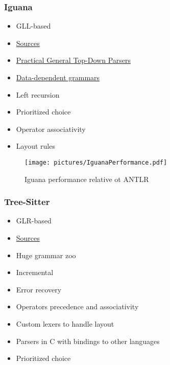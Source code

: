 \documentclass[xcolor=table,aspectratio=169]{beamer}
\begin{document}
\begin{frame}[fragile]
  \frametitle{Iguana}
  \begin{minipage}[t]{0.48\textwidth}
    
  
    \begin{itemize}
      \item GLL-based
      \item \href{https://github.com/iguana-parser/iguana}{Sources}
      \item \href{https://www.cwi.nl/nieuws/2019/thesis_final-1.pdf}{Practical General Top-Down Parsers}
      \item[\faPlus] \href{Semantics and Algorithms for Data-dependent Grammars}{Data-dependent grammars}
      \item[\faPlus] Left recursion
      \item[\faPlus] Prioritized choice
      \item[\faPlus] Operator associativity 
      \item[\faPlus] Layout rules    
    \end{itemize}  
  \end{minipage}  
  \begin{minipage}[t]{0.48\textwidth}
    \begin{figure}
      \texttt{[image: pictures/IguanaPerformance.pdf]}
      \caption{Iguana performance relative ot ANTLR\footnotemark}
    \end{figure}
  \end{minipage}
\end{frame}

\begin{frame}[fragile]
  \frametitle{Tree-Sitter}
  \begin{itemize}
    \item GLR-based
    \item \href{https://github.com/tree-sitter/tree-sitter}{Sources}
    \item[\faPlus] Huge grammar zoo
    \item[\faPlus] Incremental
    \item[\faPlus] Error recovery
    \item[\faPlus] Operators precedence  and associativity
    \item[\faMinus] Custom lexers to handle layout
    \item[\faMinus] Parsers in C with bindings to other languages  
    \item[\faMinus] Prioritized choice 
  \end{itemize}    
\end{frame}
\end{document}
